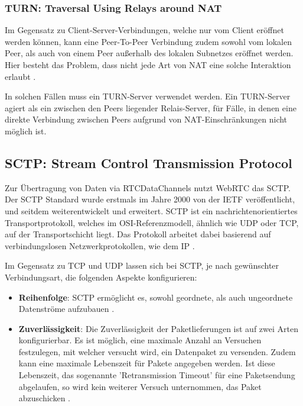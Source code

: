 \subsubsection{TURN: Traversal Using Relays around NAT}
Im Gegensatz zu Client-Server-Verbindungen, welche nur vom Client eröffnet werden können, kann eine Peer-To-Peer Verbindung zudem sowohl vom lokalen Peer, als auch von einem Peer außerhalb des lokalen Subnetzes eröffnet werden. Hier besteht das Problem, dass nicht jede Art von \acs{NAT} eine solche Interaktion erlaubt \cite{natproblemsRFC}.\par

In solchen Fällen muss ein \acs{TURN}-Server verwendet werden. Ein \acs{TURN}-Server agiert als ein zwischen den Peers liegender Relais-Server, für Fälle, in denen eine direkte Verbindung zwischen Peers aufgrund von \acs{NAT}-Einschränkungen nicht möglich ist.

\subsection{SCTP: Stream Control Transmission Protocol}
Zur Übertragung von Daten via RTCDataChannels nutzt \acs{WebRTC} das \acf{SCTP}. Der \acs{SCTP} Standard wurde erstmals im Jahre 2000 von der \acs{IETF} veröffentlicht, und seitdem weiterentwickelt und erweitert. \acs{SCTP} ist ein nachrichtenorientiertes Transportprotokoll, welches im \acf{OSI}-Referenzmodell, ähnlich wie \acs{UDP} oder \acs{TCP}, auf der Transportschicht liegt. Das Protokoll arbeitet dabei basierend auf verbindungslosen Netzwerkprotokollen, wie dem \acf{IP} \cite{sctpRFC}.\par

Im Gegensatz zu \acs{TCP} und \acs{UDP} lassen sich bei \acs{SCTP}, je nach gewünschter Verbindungsart, die folgenden Aspekte konfigurieren:
\begin{itemize}
	\item\textbf{Reihenfolge}: \acs{SCTP} ermöglicht es, sowohl geordnete, als auch ungeordnete Datenströme aufzubauen \cite{sctpRFC}.
	\item\textbf{Zuverlässigkeit}: Die Zuverlässigkeit der Paketlieferungen ist auf zwei Arten konfigurierbar. Es ist möglich, eine maximale Anzahl an Versuchen festzulegen, mit welcher versucht wird, ein Datenpaket zu versenden. Zudem kann eine maximale Lebenszeit für Pakete angegeben werden. Ist diese Lebenszeit, das sogenannte 'Retransmission Timeout' für eine Paketsendung abgelaufen, so wird kein weiterer Versuch unternommen, das Paket abzuschicken \cite{sctpRFC}.
\end{itemize}

